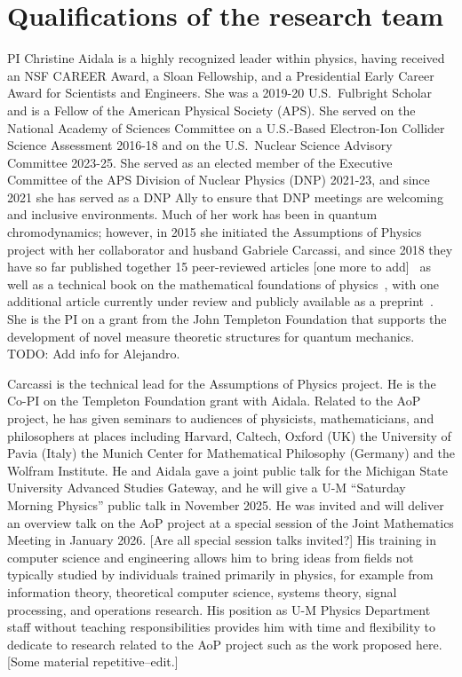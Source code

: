 \section{Qualifications of the research team}
PI Christine Aidala is a highly recognized leader within physics, having received an NSF CAREER Award, a Sloan Fellowship, and a Presidential Early Career Award for Scientists and Engineers. She was a 2019-20 U.S.~Fulbright Scholar and is a Fellow of the American Physical Society (APS).  She served on the National Academy of Sciences Committee on a U.S.-Based Electron-Ion Collider Science Assessment 2016-18 and on the U.S.~Nuclear Science Advisory Committee 2023-25.  She served as an elected member of the Executive Committee of the APS Division of Nuclear Physics (DNP) 2021-23, and since 2021 she has served as a DNP Ally to ensure that DNP meetings are welcoming and inclusive environments.  Much of her work has been in quantum chromodynamics; however, in 2015 she initiated the Assumptions of Physics project with her collaborator and husband Gabriele Carcassi, and since 2018 they have so far published together 15 peer-reviewed articles [one more to add]~\cite{aop-phys-blueprint,aop-topExpDisting,aop-HamQuantInfo,Carcassi:2021,aop-spacetimeStruct,aop-HamConsInfoEnt,Carcassi2021four,Carcassi:2022bpm,aop-HamPriv,aop-commonLogical,aop-action,aop-nogo,aop-nonaddmeas,aop-unphysHilbert} as well as a technical book on the mathematical foundations of physics~\cite{aop-book}, with one additional article currently under review and publicly available as a preprint~\cite{aop-classicallimit}.  She is the PI on a grant from the John Templeton Foundation that supports the development of novel measure theoretic structures for quantum mechanics. \\

TODO: Add info for Alejandro.

Carcassi is the technical lead for the Assumptions of Physics project.  He is the Co-PI on the Templeton Foundation grant with Aidala.  Related to the AoP project, he has given seminars to audiences of physicists, mathematicians, and philosophers at places including Harvard, Caltech, Oxford (UK) the University of Pavia (Italy) the Munich Center for Mathematical Philosophy (Germany) and the Wolfram Institute.  He and Aidala gave a joint public talk for the Michigan State University Advanced Studies Gateway, and he will give a U-M ``Saturday Morning Physics'' public talk in November 2025.  He was invited and will deliver an overview talk on the AoP project at a special session of the Joint Mathematics Meeting in January 2026.  [Are all special session talks invited?] His training in computer science and engineering allows him to bring ideas from fields not typically studied by individuals trained primarily in physics, for example from information theory, theoretical computer science, systems theory, signal processing, and operations research.  His position as U-M Physics Department staff without teaching responsibilities provides him with time and flexibility to dedicate to research related to the AoP project such as the work proposed here. [Some material repetitive--edit.]\\

